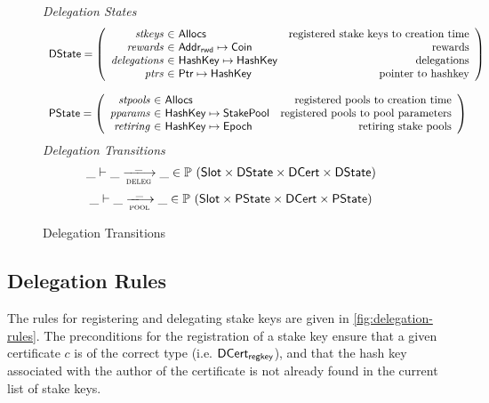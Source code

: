 \begin{figure}
  \emph{Delegation States}
  \begin{equation*}
    \begin{array}{l}
    \DState =
    \left(\begin{array}{r@{~\in~}lr}
      \var{stkeys} & \Allocs & \text{registered stake keys to creation time}\\
      \var{rewards} & \AddrRWD \mapsto \Coin & \text{rewards}\\
      \var{delegations} & \HashKey \mapsto \HashKey & \text{delegations}\\
      \var{ptrs} & \Ptr \mapsto \HashKey & \text{pointer to hashkey}\\
    \end{array}\right)
    \\
    \\
    \PState =
    \left(\begin{array}{r@{~\in~}lr}
      \var{stpools} & \Allocs & \text{registered pools to creation time}\\
      \var{pparams} & \HashKey \mapsto \StakePool
        & \text{registered pools to pool parameters}\\
      \var{retiring} & \HashKey \mapsto \Epoch & \text{retiring stake pools}\\
    \end{array}\right)
    \end{array}
  \end{equation*}
  \emph{Delegation Transitions}
  \begin{equation*}
    \_ \vdash \_ \trans{deleg}{\_} \_ \in
      \powerset (\Slot \times \DState \times \DCert \times \DState)
  \end{equation*}
  \begin{equation*}
    \_ \vdash \_ \trans{pool}{\_} \_ \in
      \powerset (\Slot \times \PState \times \DCert \times \PState)
  \end{equation*}
  \caption{Delegation Transitions}
  \label{fig:delegation-transitions}
\end{figure}

\clearpage

\subsection{Delegation Rules}
\label{sec:deleg-rules}


The rules for registering and delegating stake keys are given in
\cref{fig:delegation-rules}. The preconditions for the registration of a stake
key ensure that a given certificate $c$ is of the correct type
(i.e. $\mathsf{DCert_{regkey}}$),
and that the hash key associated with the author of the certificate is not
already found in the current list of stake keys.

